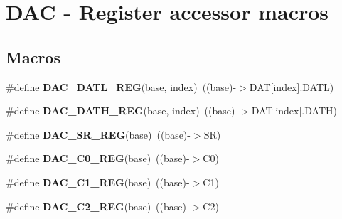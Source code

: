 \hypertarget{group___d_a_c___register___accessor___macros}{}\section{D\+AC -\/ Register accessor macros}
\label{group___d_a_c___register___accessor___macros}
\subsection*{Macros}
\begin{DoxyCompactItemize}
\item 
\mbox{\label{group___d_a_c___register___accessor___macros_ga08d6968ef33456980d21911ea2ed00f5}} 
\#define {\bfseries D\+A\+C\+\_\+\+D\+A\+T\+L\+\_\+\+R\+EG}(base,  index)~((base)-\/$>$D\+AT\mbox{[}index\mbox{]}.D\+A\+TL)
\item 
\mbox{\label{group___d_a_c___register___accessor___macros_ga53b85847dea8002316aa2880d5c27f68}} 
\#define {\bfseries D\+A\+C\+\_\+\+D\+A\+T\+H\+\_\+\+R\+EG}(base,  index)~((base)-\/$>$D\+AT\mbox{[}index\mbox{]}.D\+A\+TH)
\item 
\mbox{\label{group___d_a_c___register___accessor___macros_ga689d7e5290e37e3690b476afe279548c}} 
\#define {\bfseries D\+A\+C\+\_\+\+S\+R\+\_\+\+R\+EG}(base)~((base)-\/$>$SR)
\item 
\mbox{\label{group___d_a_c___register___accessor___macros_ga535f8efe3924aa0e193dc9a57b4cae83}} 
\#define {\bfseries D\+A\+C\+\_\+\+C0\+\_\+\+R\+EG}(base)~((base)-\/$>$C0)
\item 
\mbox{\label{group___d_a_c___register___accessor___macros_ga5177a56f528748e9c9e8138a130a289d}} 
\#define {\bfseries D\+A\+C\+\_\+\+C1\+\_\+\+R\+EG}(base)~((base)-\/$>$C1)
\item 
\mbox{\label{group___d_a_c___register___accessor___macros_ga0960302c90bdaf9930ed8dd663893ec4}} 
\#define {\bfseries D\+A\+C\+\_\+\+C2\+\_\+\+R\+EG}(base)~((base)-\/$>$C2)

\end{DoxyCompactItemize}
